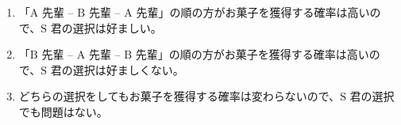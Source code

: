\documentclass[12pt]{ltjsarticle}
\begin{document}
\begin{enumerate}
\item 「$\mathrm{A}$ 先輩 -- $\mathrm{B}$ 先輩 -- $\mathrm{A}$ 先輩」の順の方がお菓子を獲得する確率は高いので、$\mathrm{S}$ 君の選択は好ましい。
\item 「$\mathrm{B}$ 先輩 -- $\mathrm{A}$ 先輩 -- $\mathrm{B}$ 先輩」の順の方がお菓子を獲得する確率は高いので、$\mathrm{S}$ 君の選択は好ましくない。
\item どちらの選択をしてもお菓子を獲得する確率は変わらないので、$\mathrm{S}$ 君の選択でも問題はない。
\end{enumerate}
\end{document}
